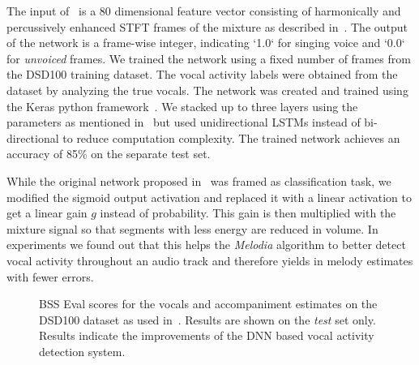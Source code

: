 The input of~\cite{Leglaive15} is a 80 dimensional feature vector consisting of harmonically and percussively enhanced STFT frames of the mixture as described in~\cite{ono08}.
The output of the network is a frame-wise integer, indicating `1.0` for singing voice and `0.0` for \emph{unvoiced} frames.
We trained the network using a fixed number of frames from the DSD100 training dataset.
The vocal activity labels were obtained from the dataset by analyzing the true vocals.
The network was created and trained using the Keras python framework~\cite{chollet15}.
We stacked up to three layers using the parameters as mentioned in~\cite{Leglaive15} but used unidirectional LSTMs instead of bi-directional to reduce computation complexity.
The trained network achieves an accuracy of 85\% on the separate test set.\par
While the original network proposed in~\cite{Leglaive15} was framed as  classification task, we modified the sigmoid output activation and replaced it with a linear activation to get a linear gain \(g\) instead of probability.
This gain is then multiplied with the mixture signal so that segments with less energy are reduced in volume.
In experiments we found out that this helps the \emph{Melodia} algorithm to better detect vocal activity throughout an audio track and therefore yields in melody estimates with fewer errors.

\begin{figure}
  \centering
  
  \caption{BSS Eval scores for the vocals and accompaniment estimates on the DSD100 dataset as used in~\cite{liutkus17}. Results are shown on the \emph{test} set only. Results indicate the improvements of the DNN based vocal activity detection system.}
  \label{fig:05_comparison_sto_stodnn}
\end{figure}


